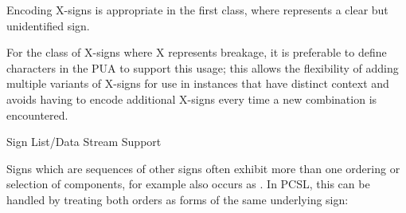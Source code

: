 \Hendol

\par Encoding X-signs is appropriate in the first class, where
       represents a clear but unidentified sign.


\par For the class of X-signs where X represents breakage, it is
      preferable to define characters in the PUA to support this
      usage; this allows the flexibility of adding multiple variants
      of X-signs for use in instances that have distinct context and
      avoids having to encode additional X-signs every time a new
       combination is encountered.

\Hhhh{}Sign List/Data Stream Support


\par Signs which are sequences of other signs often exhibit more
      than one ordering or selection of components, for example
       also occurs as
      .  In PCSL, this can be handled by
      treating both orders as forms of the same underlying sign:

